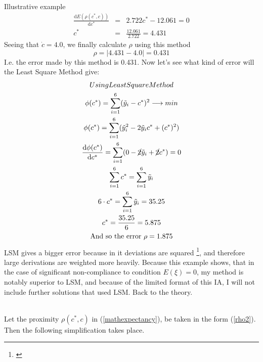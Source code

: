\begin{subsection}{Illustrative example}
\begin{eqnarray*}
\frac{\mathrm{d}E(\rho(c^{*},c))}{\mathrm{d}c^{*}} &=& 2.722c^{*}-12.061 = 0 \\
c^{*} &=& \frac{12.061}{2.722} = 4.431
\end{eqnarray*}
Seeing that $\dot{c} = 4.0$, we finally calculate $\rho$ using this method
\begin{equation*}
\rho = |4.431-4.0| = 0.431
\end{equation*}
I.e. the error made by this method is 0.431. Now let's see what kind of error will the Least Square Method give:
\begin{gather*}
Using Least Square Method \\
\phi(c^{*})= \sum\limits_{i=1}^{6}(\tilde{y}_{i}-c^{*})^{2} \longrightarrow min \\
\phi(c^{*})= \sum\limits_{i=1}^{6}(\tilde{y}_{i}^{2}-2 \tilde{y}_{i}c^{*} + (c^{*})^{2}) \\
\frac{\mathrm{d}\phi(c^{*})}{\mathrm{d}c^{*}} =  \sum\limits_{i=1}^{6}(0 -\cancel{2} \tilde{y}_{i} +\cancel{2} c^{*}) = 0 \\
\sum\limits_{i=1}^{6}c^{*} = \sum\limits_{i=1}^{6} \tilde{y}_{i} \\
6 \cdot c^{*} = \sum\limits_{i=1}^{6} \tilde{y}_{i} = 35.25 \\
c^{*} = \frac{35.25}{6} = 5.875 \\
\text{And so the error } \rho = 1.875
\end{gather*}
LSM gives a bigger error because in it deviations are squared \footnote{\cite{Plackett_1950}}, and therefore large derivations are weighted more heavily. Because this example shows, that in the case of significant non-compliance to condition $E(\xi)=0$, my method is notably superior to LSM, and because of the limited format of this IA, I will not include further solutions that used LSM. %
 Back to the theory.\\
\\
\end{subsection}
Let the proximity $\rho(c^{*},c)$ in (\ref{mathexpectancy}), be taken in the form (\ref{rho2}). Then the following simplification takes place.
